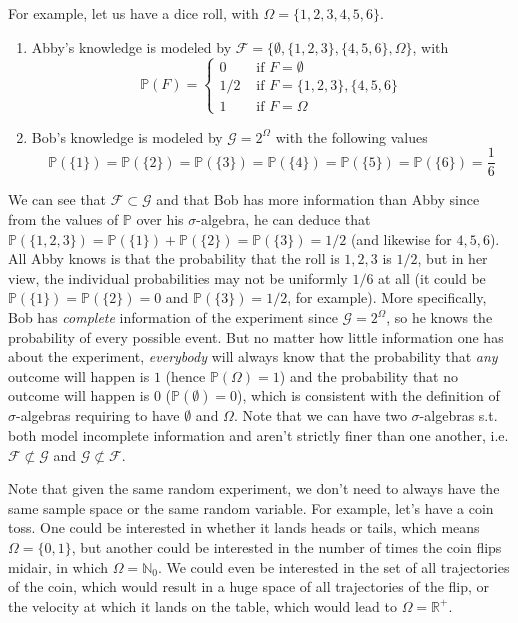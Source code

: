 \documentclass{article}
\theoremstyle{definition}
\theoremstyle{remark}
\theoremstyle{definition}
\begin{document}
For example, let us have a dice roll, with $\Omega = \{1, 2, 3, 4, 5, 6\}$.
\begin{enumerate}
    \item Abby's knowledge is modeled by $\mathcal{F} = \{\emptyset, \{1, 2, 3\}, \{4, 5, 6\}, \Omega\}$, with 
    \[\mathbb{P}(F) = \begin{cases} 0 & \text{ if } F = \emptyset \\ 
    1/2 & \text{ if } F = \{1, 2, 3\}, \{4, 5, 6\} \\ 
    1 & \text{ if } F = \Omega \end{cases}\]
    \item Bob's knowledge is modeled by $\mathcal{G} = 2^\Omega$ with the following values 
    \[\mathbb{P}(\{1\}) = \mathbb{P}(\{2\}) = \mathbb{P}(\{3\}) = \mathbb{P}(\{4\}) = \mathbb{P}(\{5\}) = \mathbb{P}(\{6\}) = \frac{1}{6}\]
\end{enumerate}
We can see that $\mathcal{F} \subset \mathcal{G}$ and that Bob has more information than Abby since from the values of $\mathbb{P}$ over his $\sigma$-algebra, he can deduce that $\mathbb{P}(\{1, 2, 3\}) = \mathbb{P}(\{1\}) + \mathbb{P}(\{2\}) = \mathbb{P}(\{3\}) = 1/2$ (and likewise for $4, 5, 6$). All Abby knows is that the probability that the roll is $1, 2, 3$ is $1/2$, but in her view, the individual probabilities may not be uniformly $1/6$ at all (it could be $\mathbb{P}(\{1\}) = \mathbb{P}(\{2\}) = 0$ and $\mathbb{P}(\{3\}) = 1/2$, for example). More specifically, Bob has \textit{complete} information of the experiment since $\mathcal{G} = 2^\Omega$, so he knows the probability of every possible event. But no matter how little information one has about the experiment, \textit{everybody} will always know that the probability that \textit{any} outcome will happen is $1$ (hence $\mathbb{P}(\Omega) = 1$) and the probability that no outcome will happen is $0$ ($\mathbb{P}(\emptyset) = 0$), which is consistent with the definition of $\sigma$-algebras requiring to have $\emptyset$ and $\Omega$. Note that we can have two $\sigma$-algebras s.t. both model incomplete information and aren't strictly finer than one another, i.e. $\mathcal{F} \not\subset \mathcal{G}$ and $\mathcal{G} \not\subset \mathcal{F}$. 

Note that given the same random experiment, we don't need to always have the same sample space or the same random variable. For example, let's have a coin toss. One could be interested in whether it lands heads or tails, which means $\Omega = \{0, 1\}$, but another could be interested in the number of times the coin flips midair, in which $\Omega = \mathbb{N}_0$. We could even be interested in the set of all trajectories of the coin, which would result in a huge space of all trajectories of the flip, or the velocity at which it lands on the table, which would lead to $\Omega = \mathbb{R}^+$. 
\end{document}
